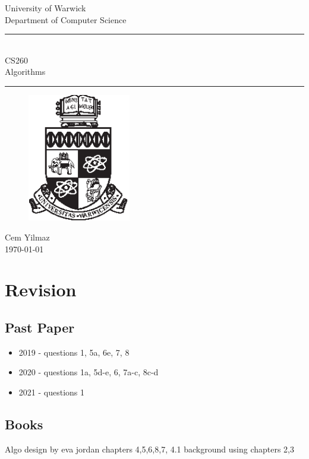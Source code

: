 \documentclass[a4paper]{article}
\theoremstyle{plain}
\theoremstyle{definition}
\theoremstyle{remark}
\begin{document}
	\begin{titlepage}
	\begin{center}
	\large
	University of Warwick \\
	Department of Computer Science \\
	\huge
	\vspace{50mm}
	\rule{\linewidth}{0.5pt} \\
	CS260 \\
	\vspace{5mm}
	\Large
	Algorithms	
	\rule{\linewidth}{0.5pt}
	\vspace{5mm}
	\begin{figure}[H]
	\centering
	\includegraphics[width=0.4\textwidth]{crest_black.eps}
	\end{figure}
	\vspace{37mm}
	Cem Yilmaz \\
	\today
	\end{center}
	\end{titlepage}	
	\tableofcontents
	\section{Revision}
	\subsection{Past Paper}
	\begin{itemize}
		\item 2019 - questions 1, 5a, 6e, 7, 8
		\item 2020 - questions 1a, 5d-e, 6, 7a-c, 8c-d
		\item 2021 - questions 1
	\end{itemize}
	\subsection{Books}
	Algo design by eva jordan
	chapters 4,5,6,8,7, 4.1
	background using chapters 2,3
\end{document}
